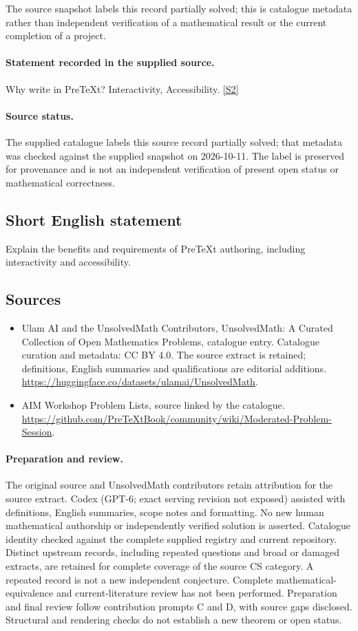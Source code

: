 \documentclass[11pt]{article}
\begin{document}
The source snapshot labels this record partially solved; this is catalogue metadata rather than independent verification of a mathematical result or the current completion of a project.
\paragraph{Statement recorded in the supplied source.}
Why write in PreTeXt? Interactivity, Accessibility. \href{https://github.com/PreTeXtBook/community/wiki/Moderated-Problem-Session}{[S2]}
\paragraph{Source status.}
The supplied catalogue labels this source record partially solved; that metadata was checked against the supplied snapshot on 2026-10-11. The label is preserved for provenance and is not an independent verification of present open status or mathematical correctness.
\subsection{Short English statement}
Explain the benefits and requirements of PreTeXt authoring, including interactivity and accessibility.
\subsection{Sources}
\begin{itemize}
\item[S1] Ulam AI and the UnsolvedMath Contributors, UnsolvedMath: A Curated Collection of Open Mathematics Problems, catalogue entry. Catalogue curation and metadata: CC BY 4.0. The source extract is retained; definitions, English summaries and qualifications are editorial additions.
\url{https://huggingface.co/datasets/ulamai/UnsolvedMath}.
\item[S2] AIM Workshop Problem Lists, source linked by the catalogue.
\url{https://github.com/PreTeXtBook/community/wiki/Moderated-Problem-Session}.
\end{itemize}
\paragraph{Preparation and review.}
The original source and UnsolvedMath contributors retain attribution for the source extract. Codex (GPT-6; exact serving revision not exposed) assisted with definitions, English summaries, scope notes and formatting. No new human mathematical authorship or independently verified solution is asserted. Catalogue identity checked against the complete supplied registry and current repository. Distinct upstream records, including repeated questions and broad or damaged extracts, are retained for complete coverage of the source CS category. A repeated record is not a new independent conjecture. Complete mathematical-equivalence and current-literature review has not been performed. Preparation and final review follow contribution prompts C and D, with source gaps disclosed. Structural and rendering checks do not establish a new theorem or open status.
\label{end:statement}
\end{document}

